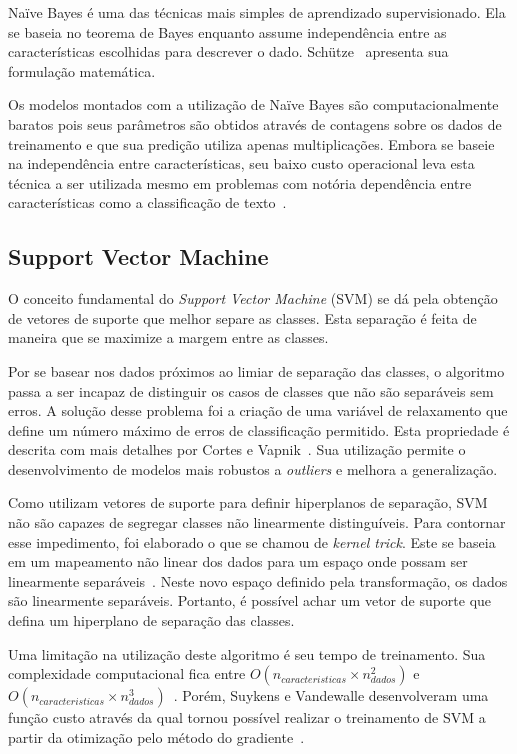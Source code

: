 Naïve Bayes é uma das técnicas mais simples de aprendizado supervisionado.
Ela se baseia no teorema de Bayes enquanto assume independência entre as características escolhidas para descrever o dado.
Schütze~\cite{schutze08} apresenta sua formulação matemática.

Os modelos montados com a utilização de Naïve Bayes são computacionalmente baratos pois seus parâmetros são obtidos
através de contagens sobre os dados de treinamento e que sua predição utiliza apenas multiplicações.
Embora se baseie na independência entre características, seu baixo custo operacional leva esta técnica a ser utilizada
mesmo em problemas com notória dependência entre características como a classificação de texto~\cite{mccallum98}.


\subsection{Support Vector Machine}

O conceito fundamental do \textit{Support Vector Machine} (SVM) se dá pela obtenção de vetores de suporte que melhor
separe as classes.
Esta separação é feita de maneira que se maximize a margem entre as classes.

Por se basear nos dados próximos ao limiar de separação das classes, o algoritmo passa a ser incapaz de distinguir os
casos de classes que não são separáveis sem erros.
A solução desse problema foi a criação de uma variável de relaxamento que define um número máximo de erros de
classificação permitido.
Esta propriedade é descrita com mais detalhes por Cortes e Vapnik~\cite{cortes95}.
Sua utilização permite o desenvolvimento de modelos mais robustos a \textit{outliers} e melhora a generalização.

Como utilizam vetores de suporte para definir hiperplanos de separação, SVM não são capazes de segregar classes não
linearmente distinguíveis.
Para contornar esse impedimento, foi elaborado o que se chamou de \textit{kernel trick}.
Este se baseia em um mapeamento não linear dos dados para um espaço onde possam ser linearmente
separáveis~\cite{scholkopf02}.
Neste novo espaço definido pela transformação, os dados são linearmente separáveis.
Portanto, é possível achar um vetor de suporte que defina um hiperplano de separação das classes.

Uma limitação na utilização deste algoritmo é seu tempo de treinamento. Sua complexidade computacional fica entre
$O(n_{caracteristicas} \times n_{dados}^2)$ e $O(n_{caracteristicas} \times n_{dados}^3)$~\cite{list09}.
Porém, Suykens e Vandewalle desenvolveram uma função custo através da qual tornou possível realizar o treinamento de SVM
a partir da otimização pelo método do gradiente~\cite{suykens99}.

